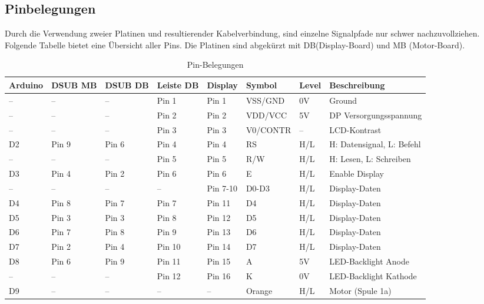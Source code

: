 \documentclass[11pt, titlepage]{report}
\begin{document}
			\subsection{Pinbelegungen}
			\label{sec:Gesamtschaltung}
				Durch die Verwendung zweier Platinen und resultierender Kabelverbindung, sind einzelne Signalpfade nur schwer nachzuvollziehen. Folgende Tabelle bietet eine Übersicht aller Pins. Die Platinen sind abgekürzt mit DB(Display-Board) und MB (Motor-Board).
				\begin{table}[htbp]
					\centering
					\caption[Pin-Belegungen]{Pin-Belegungen}
					\label{tab:tabDisplay}
					\begin{tabular}{llllllll}
					\toprule
						\textbf{Arduino} & \textbf{DSUB MB} 	  & \textbf{DSUB DB} 	& \textbf{Leiste DB} 	& \textbf{Display}	 & \textbf{Symbol}   & \textbf{Level} & \textbf{Beschreibung}\\
					\midrule
						--		&--			&--		& Pin 1		& Pin 1		& VSS/GND	& 0V	& Ground\\
						--		&--			&--		& Pin 2		& Pin 2		& VDD/VCC	& 5V	& DP Versorgungsspannung\\
						--		&--			&--		& Pin 3		& Pin 3		& V0/CONTR	& --	& LCD-Kontrast\\
						D2		& Pin 9		& Pin 6	& Pin 4		& Pin 4		& RS		& H/L	& H: Datensignal, L: Befehl\\
						--		&--			&--		& Pin 5		& Pin 5		& R/W		& H/L	& H: Lesen, L: Schreiben\\
						D3		& Pin 4		& Pin 2	& Pin 6		& Pin 6		& E			& H/L	& Enable Display\\
						--		&--			&--		& --		& Pin 7-10	& D0-D3		& H/L	& Display-Daten\\
						D4		& Pin 8		& Pin 7	& Pin 7		& Pin 11	& D4		& H/L	& Display-Daten\\
						D5		& Pin 3		& Pin 3	& Pin 8		& Pin 12	& D5		& H/L	& Display-Daten\\
						D6		& Pin 7		& Pin 8	& Pin 9		& Pin 13	& D6		& H/L	& Display-Daten\\
						D7		& Pin 2		& Pin 4	& Pin 10	& Pin 14	& D7		& H/L	& Display-Daten\\
						D8		& Pin 6		& Pin 9	& Pin 11	& Pin 15	& A			& 5V	& LED-Backlight Anode\\
						--		&--			&--		& Pin 12	& Pin 16	& K			& 0V	& LED-Backlight Kathode\\
						D9		&--			&--		& --		& --		& Orange	& H/L	& Motor (Spule 1a)\\

\end{tabular}
\end{table}
\end{document}
